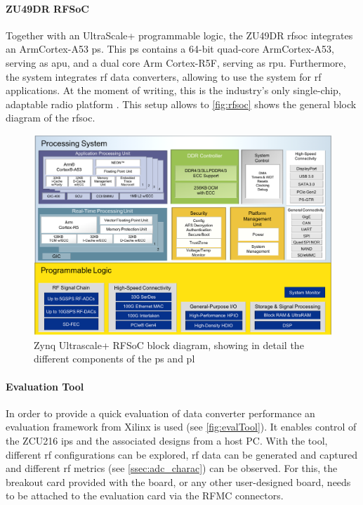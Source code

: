 \paragraph{ZU49DR RFSoC}
Together with an UltraScale+ programmable logic, the ZU49DR \gls{rfsoc} integrates an Arm\textregistered Cortex\texttrademark-A53 \gls{ps}.
This \gls{ps} contains a 64-bit quad-core Arm\textregistered Cortex\texttrademark-A53, serving as \gls{apu}, and a dual core Arm Cortex-R5F, serving as \gls{rpu}.
Furthermore, the system integrates \gls{rf} data converters, allowing to use the system for \gls{rf} applications.
At the moment of writing, this is the industry's only single-chip, adaptable radio platform \cite{zu49}.
This setup allows to 
\autoref{fig:rfsoc} shows the general block diagram of the \gls{rfsoc}.

\begin{figure}[tbh]
	\centering
	\includegraphics[width = \textwidth]{chap/04-work/img/rfsoc_blockdiagram}
	\caption[Zynq Ultrascale+ RFSoC block diagram]{Zynq Ultrascale+ RFSoC block diagram, showing in detail the different components of the \gls{ps} and \gls{pl}}
	\label{fig:rfsoc}
\end{figure}

\paragraph{Evaluation Tool}
In order to provide a quick evaluation of data converter performance an evaluation framework from Xilinx is used (see \autoref{fig:evalTool}). 
It enables control of the ZCU216 \glspl{ip} and the associated designs from a host PC. 
With the tool, different \gls{rf} configurations can be explored, \gls{rf} data can be generated and captured and different \gls{rf} metrics (see \autoref{ssec:adc_charac}) can be observed.  
For this, the breakout card provided with the board, or any other user-designed board, needs to be attached to the evaluation card via the RFMC connectors.

